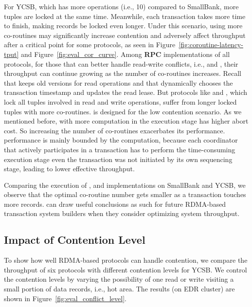For YCSB, which has more operations (i.e., 10) compared to SmallBank, more tuples are locked at the same time. Meanwhile, each transaction takes more time to finish, making records be locked even longer. Under this scenario, using more co-routines may significantly increase contention and adversely affect throughput after a critical point for some protocols, as seen in Figure~\ref{fig:coroutine-latency-tput} and Figure~\ref{fig:eval_cor_curve}. Among \textbf{RPC} implementations of all protocols, for those that can better handle read-write conflicts, i.e., \mvcc and \sundial, their throughput can continue growing as the number of co-routines increases. Recall that \mvcc keeps old versions for read operations and that \sundial dynamically chooses the transaction timestamp and updates the read lease. But protocols like \nowait and \waitdie, which lock all tuples involved in read and write operations, suffer from longer locked tuples with more co-routines. \occ 
is designed for the low contention scenario. 
As we mentioned before, with more computation in the execution stage \occ has higher abort cost. So increasing the number of co-routines exacerbates its performance. \calvin performance is mainly bounded by the computation, because each coordinator that actively participates in a transaction has to perform the time-consuming execution stage even the transaction was not initiated by its own sequencing stage, leading to lower effective throughput. 

Comparing the execution of \nowait, \waitdie and \occ implementations on SmallBank and YCSB, we observe that the optimal co-routine number gets smaller as a transaction touches more records. \projectname can draw useful conclusions as such for future RDMA-based transaction system builders when they consider optimizing system throughput.

\vspace{-2mm}
\subsection{Impact of Contention Level}
 \vspace{-2mm}



To show how well RDMA-based protocols can handle contention, we compare the throughput of six protocols with different contention levels for YCSB. We control the contention levels by varying the possibility of one read or write visiting a small portion of data records, i.e., hot area. 
The results (on EDR cluster) are shown in Figure~\ref{fig:eval_conflict_level}. 


